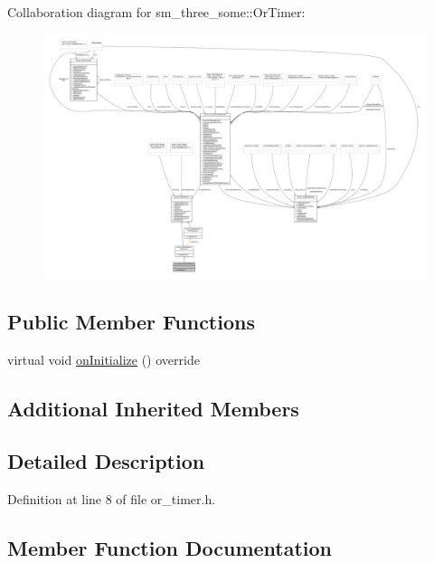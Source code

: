 Collaboration diagram for sm\+\_\+three\+\_\+some\+:\+:Or\+Timer\+:
\nopagebreak
\begin{figure}[H]
\begin{center}
\leavevmode
\includegraphics[width=350pt]{classsm__three__some_1_1OrTimer__coll__graph}
\end{center}
\end{figure}
\subsection*{Public Member Functions}
\begin{DoxyCompactItemize}
\item 
virtual void \hyperlink{classsm__three__some_1_1OrTimer_a756a41ced34733951def1d2aac8a1bb1}{on\+Initialize} () override
\end{DoxyCompactItemize}
\subsection*{Additional Inherited Members}


\subsection{Detailed Description}


Definition at line 8 of file or\+\_\+timer.\+h.



\subsection{Member Function Documentation}
